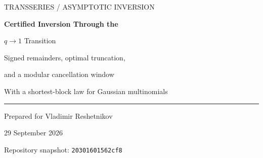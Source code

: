 \documentclass[11pt,a4paper]{article}
\newcommand{\ee}{\mathrm e}
\numberwithin{equation}{section}
\theoremstyle{plain}
\theoremstyle{definition}
\theoremstyle{remark}
\begin{document}
\hypersetup{pageanchor=false}
\begin{titlepage}
\thispagestyle{empty}
\vspace*{13mm}
{\color{MidnightBlue}\large TRANSSERIES \enspace / \enspace ASYMPTOTIC INVERSION}\par
\vspace{12mm}
{\Huge\bfseries Certified Inversion Through the\par $q\to1$ Transition}\par
\vspace{7mm}
{\Large Signed remainders, optimal truncation,\par and a modular cancellation window}\par
\vspace{8mm}
{\large With a shortest-block law for Gaussian multinomials}\par
\vspace{12mm}
\hrule
\vspace{5mm}
Prepared for Vladimir Reshetnikov\par
29 September 2026\par
Repository snapshot: \texttt{20301601562cf8}\par
\vspace{9mm}
\begin{abstract}
The simultaneous limit $q=\ee^h\to1^+$ and $x\to\infty$ reorganizes the
transseries of Gaussian binomial coefficients: the finite-product tail enters a
dilogarithmic dominant phase, while the Euler product contributes a separate
modular exponential. We prove an exact positive-kernel remainder formula for
the canonical real interpolation of the central Gaussian binomial. It yields
signed first-omitted-term bounds for every $h,x>0$, a fixed-order bound uniform
up to $hx=0$, and two-sided rational approximations from a determinate
Stieltjes measure.


\end{abstract}
\end{titlepage}
\end{document}
